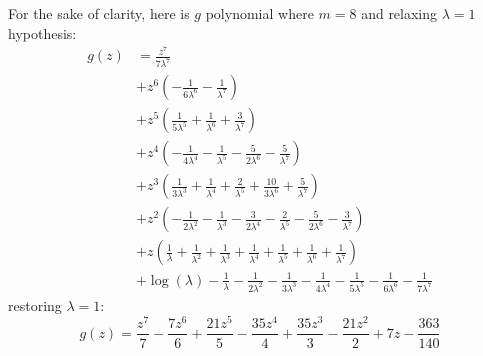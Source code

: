 For the sake of clarity, here is $g$ polynomial where $m=8$ and relaxing $\lambda=1$ hypothesis:
\begin{displaymath}
\begin{split}
g{\left (z \right )} &= \frac{z^{7}}{7 \lambda^{7}} \\
&+ z^{6} \left(- \frac{1}{6 \lambda^{6}} - \frac{1}{\lambda^{7}}\right) \\
&+ z^{5} \left(\frac{1}{5 \lambda^{5}} + \frac{1}{\lambda^{6}} + \frac{3}{\lambda^{7}}\right) \\
&+ z^{4} \left(- \frac{1}{4 \lambda^{4}} - \frac{1}{\lambda^{5}} - \frac{5}{2 \lambda^{6}} - \frac{5}{\lambda^{7}}\right) \\
&+ z^{3} \left(\frac{1}{3 \lambda^{3}} + \frac{1}{\lambda^{4}} + \frac{2}{\lambda^{5}} + \frac{10}{3 \lambda^{6}} + \frac{5}{\lambda^{7}}\right) \\
&+ z^{2} \left(- \frac{1}{2 \lambda^{2}} - \frac{1}{\lambda^{3}} - \frac{3}{2 \lambda^{4}} - \frac{2}{\lambda^{5}} - \frac{5}{2 \lambda^{6}} - \frac{3}{\lambda^{7}}\right) \\
&+ z \left(\frac{1}{\lambda} + \frac{1}{\lambda^{2}} + \frac{1}{\lambda^{3}} + \frac{1}{\lambda^{4}} + \frac{1}{\lambda^{5}} + \frac{1}{\lambda^{6}} + \frac{1}{\lambda^{7}}\right) \\
&+ \log{\left (\lambda \right )} - \frac{1}{\lambda} - \frac{1}{2 \lambda^{2}} - \frac{1}{3 \lambda^{3}} - \frac{1}{4 \lambda^{4}} - \frac{1}{5 \lambda^{5}} - \frac{1}{6 \lambda^{6}} - \frac{1}{7 \lambda^{7}}
\end{split}
\end{displaymath}
restoring $\lambda=1$:
\begin{displaymath}
g{\left (z \right )} = \frac{z^{7}}{7} - \frac{7 z^{6}}{6} + \frac{21 z^{5}}{5} - \frac{35 z^{4}}{4} + \frac{35 z^{3}}{3} - \frac{21 z^{2}}{2} + 7 z - \frac{363}{140}
\end{displaymath}



